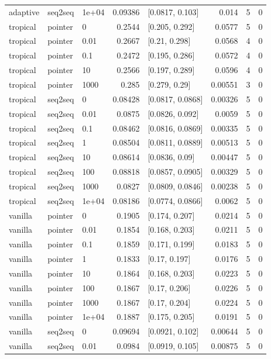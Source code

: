 \documentclass[10pt]{article}
\begin{document}
{\begin{longtable}{lllrlrrr}
adaptive & seq2seq & 1e+04 & 0.09386 & [0.0817, 0.103] & 0.014 & 5 & 0\\
tropical & pointer & 0 & 0.2544 & [0.205, 0.292] & 0.0577 & 5 & 0\\
tropical & pointer & 0.01 & 0.2667 & [0.21, 0.298] & 0.0568 & 4 & 0\\
tropical & pointer & 0.1 & 0.2472 & [0.195, 0.286] & 0.0572 & 4 & 0\\
tropical & pointer & 10 & 0.2566 & [0.197, 0.289] & 0.0596 & 4 & 0\\
tropical & pointer & 1000 & 0.285 & [0.279, 0.29] & 0.00551 & 3 & 0\\
tropical & seq2seq & 0 & 0.08428 & [0.0817, 0.0868] & 0.00326 & 5 & 0\\
tropical & seq2seq & 0.01 & 0.0875 & [0.0826, 0.092] & 0.0059 & 5 & 0\\
tropical & seq2seq & 0.1 & 0.08462 & [0.0816, 0.0869] & 0.00335 & 5 & 0\\
tropical & seq2seq & 1 & 0.08504 & [0.0811, 0.0889] & 0.00513 & 5 & 0\\
tropical & seq2seq & 10 & 0.08614 & [0.0836, 0.09] & 0.00447 & 5 & 0\\
tropical & seq2seq & 100 & 0.08818 & [0.0857, 0.0905] & 0.00329 & 5 & 0\\
tropical & seq2seq & 1000 & 0.0827 & [0.0809, 0.0846] & 0.00238 & 5 & 0\\
tropical & seq2seq & 1e+04 & 0.08186 & [0.0774, 0.0866] & 0.0062 & 5 & 0\\
vanilla & pointer & 0 & 0.1905 & [0.174, 0.207] & 0.0214 & 5 & 0\\
vanilla & pointer & 0.01 & 0.1854 & [0.168, 0.203] & 0.0211 & 5 & 0\\
vanilla & pointer & 0.1 & 0.1859 & [0.171, 0.199] & 0.0183 & 5 & 0\\
vanilla & pointer & 1 & 0.1833 & [0.17, 0.197] & 0.0176 & 5 & 0\\
vanilla & pointer & 10 & 0.1864 & [0.168, 0.203] & 0.0223 & 5 & 0\\
vanilla & pointer & 100 & 0.1867 & [0.17, 0.206] & 0.0226 & 5 & 0\\
vanilla & pointer & 1000 & 0.1867 & [0.17, 0.204] & 0.0224 & 5 & 0\\
vanilla & pointer & 1e+04 & 0.1887 & [0.175, 0.205] & 0.0191 & 5 & 0\\
vanilla & seq2seq & 0 & 0.09694 & [0.0921, 0.102] & 0.00644 & 5 & 0\\
vanilla & seq2seq & 0.01 & 0.0984 & [0.0919, 0.105] & 0.00875 & 5 & 0\\

\end{longtable}}
\end{document}
